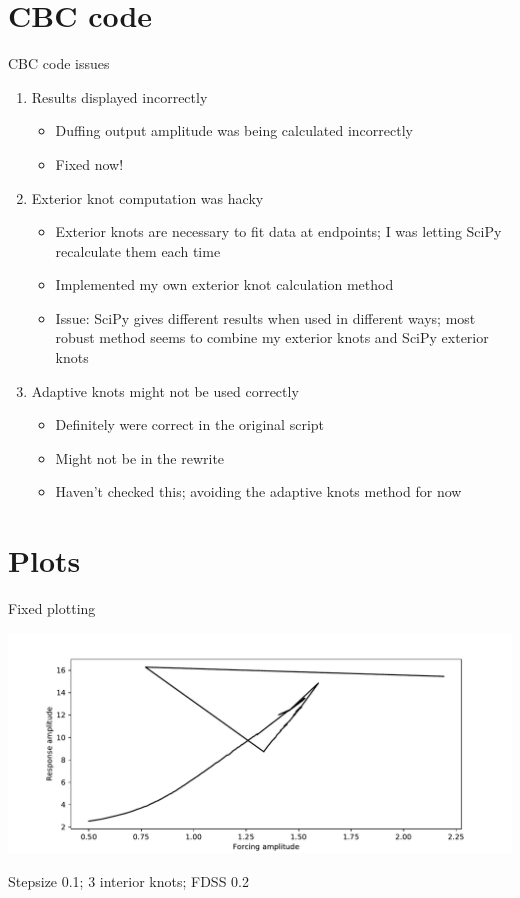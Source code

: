 \documentclass[presentation]{beamer}
\begin{document}
\section{CBC code}
\label{sec:org77c3cf6}
\begin{frame}[<+->][label={sec:org62e38d6}]{CBC code issues}
\begin{enumerate}
\item Results displayed incorrectly
\begin{itemize}
\item Duffing output amplitude was being calculated incorrectly
\item Fixed now!
\end{itemize}
\item Exterior knot computation was hacky
\begin{itemize}
\item Exterior knots are necessary to fit data at endpoints; I was letting SciPy recalculate them each time
\item Implemented my own exterior knot calculation method
\item Issue: SciPy gives different results when used in different ways; most robust method seems to combine my exterior knots and SciPy exterior knots
\end{itemize}
\item Adaptive knots might not be used correctly
\begin{itemize}
\item Definitely were correct in the original script
\item Might not be in the rewrite
\item Haven't checked this; avoiding the adaptive knots method for now
\end{itemize}
\end{enumerate}
\end{frame}

\section{Plots}
\label{sec:org958de54}
\begin{frame}[label={sec:org411d584}]{Fixed plotting}
\begin{center}
\includegraphics[width=.9\linewidth]{./stepsize0d1_dsize3_fdss0d2_fixed_plotting.pdf}
\end{center}

Stepsize 0.1; 3 interior knots; FDSS 0.2
\end{frame}
\end{document}
